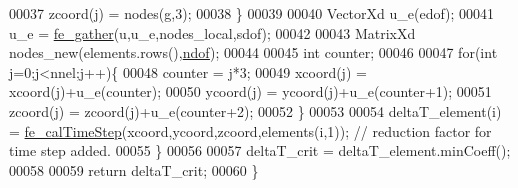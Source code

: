 \begin{DoxyCode}
00037             zcoord(j) = nodes(g,3);
00038         \}
00039 
00040         VectorXd u\_e(edof);
00041         u\_e = \hyperlink{functions_8h_ab5053cb12ac67971a7836346e2839725}{fe\_gather}(u,u\_e,nodes\_local,sdof);
00042 
00043         MatrixXd nodes\_new(elements.rows(),\hyperlink{_global_variables_8h_aa789fe4d8a13fd0990b630909430d5d0}{ndof});
00044 
00045         \textcolor{keywordtype}{int} counter;
00046 
00047         \textcolor{keywordflow}{for}(\textcolor{keywordtype}{int} j=0;j<nnel;j++)\{
00048             counter = j*3;
00049             xcoord(j) = xcoord(j)+u\_e(counter);
00050             ycoord(j) = ycoord(j)+u\_e(counter+1);
00051             zcoord(j) = zcoord(j)+u\_e(counter+2);
00052         \}
00053 
00054         deltaT\_element(i) = \hyperlink{functions_8h_a295b08cc71d5af080f0450614a01a4e6}{fe\_calTimeStep}(xcoord,ycoord,zcoord,elements(i,1)); \textcolor{comment}{// reduction
       factor for time step added.}
00055     \}
00056 
00057     deltaT\_crit = deltaT\_element.minCoeff();
00058 
00059     \textcolor{keywordflow}{return} deltaT\_crit;
00060 \}
\end{DoxyCode}
